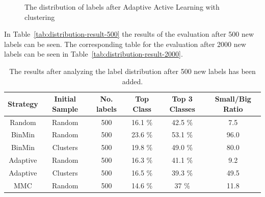 \begin{figure}
    \centering
    \caption{The distribution of labels after Adaptive Active Learning with clustering}
    \label{fig:class-distribution-reuters-adaptive-clusters}
\end{figure}

In Table~\ref{tab:distribution-result-500} the results of the evaluation after 500 new labels can be seen.
The corresponding table for the evaluation after 2000 new labels can be seen in Table~\ref{tab:distribution-result-2000}.

\begin{table}[h!]
    \centering
    \begin{tabular}{|cccccc|}
        \hline
        \textbf{Strategy} & \textbf{Initial Sample} & \textbf{No. labels} & \textbf{Top Class} & \textbf{Top 3 Classes} & \textbf{Small/Big Ratio}\\
        \hline
        Random & Random & 500 & 16.1 \% & 42.5 \% & 7.5 \\
        BinMin & Random & 500 & 23.6 \% & 53.1 \% & 96.0 \\
        BinMin & Clusters & 500 & 19.8 \% & 49.0 \% & 80.0 \\
        Adaptive & Random & 500 & 16.3 \% & 41.1 \% & 9.2 \\
        Adaptive & Clusters & 500 & 16.5 \% & 39.3 \% & 49.5 \\
        MMC & Random & 500 & 14.6 \% & 37 \% & 11.8 \\
        \hline
    \end{tabular}
    \caption{The results after analyzing the label distribution after 500 new labels has been added.}
    \label{tab:distribution-result}
\end{table}

